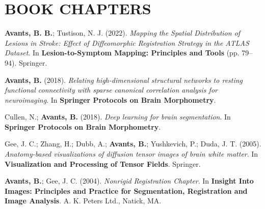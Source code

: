 \documentclass[10pt,letterpaper]{article}
\begin{document}
\section{BOOK CHAPTERS}
\begin{enumerate}
{\footnotesize
  \item \textbf{Avants, B. B.}; Tustison, N. J. (2022). \textit{Mapping the Spatial Distribution of Lesions in Stroke: Effect of Diffeomorphic Registration Strategy in the ATLAS Dataset}. In \textbf{Lesion-to-Symptom Mapping: Principles and Tools} (pp. 79--94). Springer.
  \item \textbf{Avants, B.} (2018). \textit{Relating high-dimensional structural networks to resting functional connectivity with sparse canonical correlation analysis for neuroimaging}. In \textbf{Springer Protocols on Brain Morphometry}.
  \item Cullen, N.; \textbf{Avants, B.} (2018). \textit{Deep learning for brain segmentation}. In \textbf{Springer Protocols on Brain Morphometry}.
  \item Gee, J. C.; Zhang, H.; Dubb, A.; \textbf{Avants, B.}; Yushkevich, P.; Duda, J. T. (2005). \textit{Anatomy-based visualizations of diffusion tensor images of brain white matter}. In \textbf{Visualization and Processing of Tensor Fields}. Springer.
  \item \textbf{Avants, B.}; Gee, J. C. (2004). \textit{Nonrigid Registration Chapter}. In \textbf{Insight Into Images: Principles and Practice for Segmentation, Registration and Image Analysis}. A. K. Peters Ltd., Natick, MA.
}
\end{enumerate}
\end{document}
